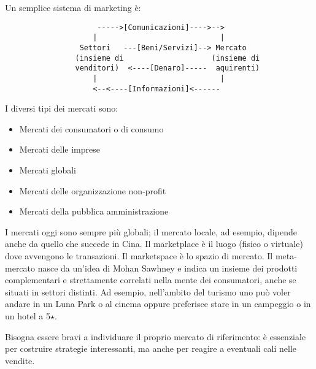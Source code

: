 \documentclass[11pt]{article}
\begin{document}
\noindent Un semplice sistema di marketing è:
\begin{verbatim}
                     ----->[Comunicazioni]---->-->
                    |                            |
                 Settori   ---[Beni/Servizi]--> Mercato
                (insieme di                    (insieme di
                venditori)  <----[Denaro]-----  aquirenti)
                    |                            |
                    <--<----[Informazioni]<------
\end{verbatim}

\noindent I diversi tipi dei mercati sono:
\begin{itemize}[noitemsep, topsep=0ex]
	\item Mercati dei consumatori o di consumo
	\item Mercati delle imprese
	\item Mercati globali
	\item Mercati delle organizzazione non-profit
	\item Mercati della pubblica amministrazione
\end{itemize}

\noindent
I mercati oggi sono sempre più globali; il mercato locale, ad esempio, dipende anche da quello che succede in Cina. 
Il marketplace è il luogo (fisico o virtuale) dove avvengono le transazioni.
Il marketspace è lo spazio di mercato.
Il meta-mercato nasce da un'idea di Mohan Sawhney e indica un insieme dei prodotti complementari e strettamente correlati nella mente dei consumatori, anche se situati in settori distinti. Ad esempio, nell'ambito del turismo uno può voler andare in un Luna Park o al cinema oppure preferisce stare in un campeggio o in un hotel a 5$\star$.

Bisogna essere bravi a individuare il proprio mercato di riferimento: è essenziale per costruire strategie interessanti, ma anche per reagire a eventuali cali nelle vendite.
~\\
\end{document}
